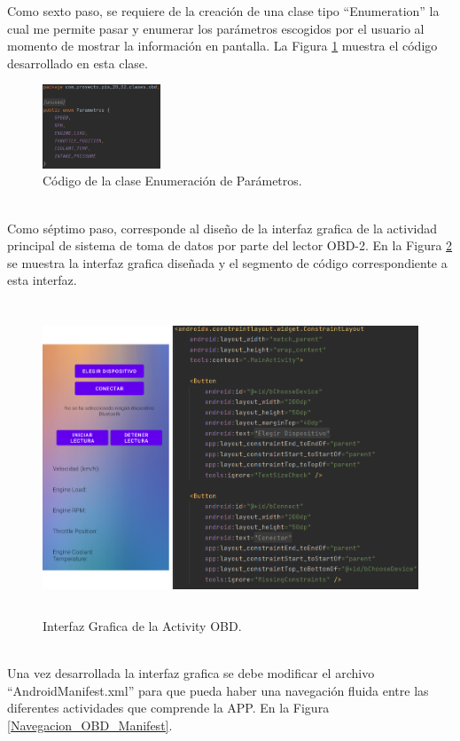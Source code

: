 \documentclass[a4paper,10pt, oneside, titlepage]{article}
\begin{document}
	\indent Como sexto paso, se requiere de la creación de una clase tipo ``Enumeration'' la cual me permite pasar y enumerar los parámetros escogidos por el usuario al momento de mostrar la información en pantalla. La Figura \ref{Enumeracion_Parametros_OBD} muestra el código desarrollado en esta clase.
	\begin{figure}[!h]
		\centering
		\includegraphics[width = 0.75\linewidth, height = 2.5cm]{Enumeracion_Parametros_OBD.png}
		\caption{Código de la clase Enumeración de Parámetros.}
		\label{Enumeracion_Parametros_OBD}
	\end{figure} \\
	\indent Como séptimo paso, corresponde al diseño de la interfaz grafica de la actividad principal de sistema de toma de datos por parte del lector OBD-2. En la Figura \ref{Interfaz_Grafica_OBD} se muestra la interfaz grafica diseñada y el segmento de código correspondiente a esta interfaz.
	\begin{figure}[!h]
		\centering
		\includegraphics[width = 1\linewidth, height = 9.3cm]{Interfaz_Grafica_OBD.png}
		\caption{Interfaz Grafica de la Activity OBD.}
		\label{Interfaz_Grafica_OBD}
	\end{figure} \\
	\indent Una vez desarrollada la  interfaz grafica se debe modificar el archivo ``AndroidManifest.xml'' para que pueda haber una navegación fluida entre las diferentes actividades que comprende la APP. En la Figura \ref{Navegacion_OBD_Manifest}.
\end{document}
